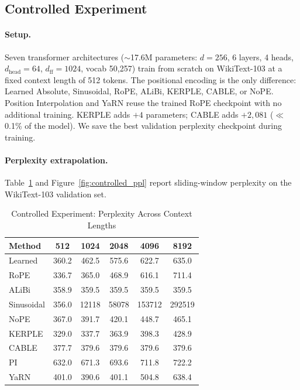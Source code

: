 \documentclass[conference]{IEEEtran}
\begin{document}
\subsection{Controlled Experiment}
\label{sec:controlled}

\paragraph{Setup.} Seven transformer architectures ($\sim$17.6M parameters: $d{=}256$, 6 layers, 4 heads, $d_{\text{head}}{=}64$, $d_{\text{ff}}{=}1024$, vocab 50,257) train from scratch on WikiText-103 at a fixed context length of 512 tokens. The positional encoding is the only difference: Learned Absolute, Sinusoidal, RoPE, ALiBi, KERPLE, CABLE, or NoPE. Position Interpolation and YaRN reuse the trained RoPE checkpoint with no additional training. KERPLE adds $+4$ parameters; CABLE adds $+2{,}081$ ($\ll$0.1\% of the model). We save the best validation perplexity checkpoint during training.

\paragraph{Perplexity extrapolation.} Table~\ref{tab:controlled_ppl} and Figure~\ref{fig:controlled_ppl} report sliding-window perplexity on the WikiText-103 validation set.

\begin{table}[!t]
\caption{Controlled Experiment: Perplexity Across Context Lengths}
\label{tab:controlled_ppl}
\centering
\scriptsize
\setlength{\tabcolsep}{2.5pt}
\begin{tabular*}{\columnwidth}{@{\extracolsep{\fill}}lccccc}
\hline
\textbf{Method} & \textbf{512} & \textbf{1024} & \textbf{2048} & \textbf{4096} & \textbf{8192} \\
\hline
Learned & 360.2 & 462.5 & 575.6 & 622.7 & 635.0 \\
RoPE & 336.7 & 365.0 & 468.9 & 616.1 & 711.4 \\
ALiBi & 358.9 & 359.5 & 359.5 & 359.5 & 359.5 \\
Sinusoidal & 356.0 & 12118 & 58078 & 153712 & 292519 \\
NoPE & 367.0 & 391.7 & 420.1 & 448.7 & 465.1 \\
KERPLE & 329.0 & 337.7 & 363.9 & 398.3 & 428.9 \\
CABLE & 377.7 & 379.6 & 379.6 & 379.6 & 379.6 \\
PI & 632.0 & 671.3 & 693.6 & 711.8 & 722.2 \\
YaRN & 401.0 & 390.6 & 401.1 & 504.8 & 638.4 \\
\hline
\end{tabular*}
\end{table}
\end{document}
